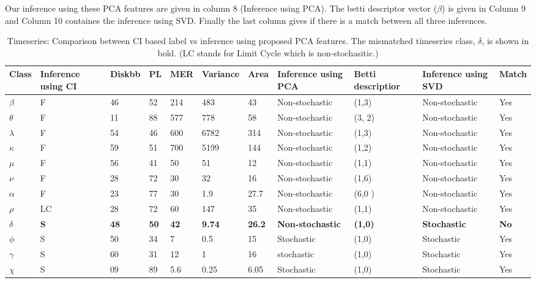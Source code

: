 \documentclass[10pt,conference]{IEEEtran}
\begin{document}
Our inference using these PCA features are given in column 8 (Inference using PCA). The betti descriptor vector ($\beta$) is given in Column 9 and Column 10 containes the inference using SVD. Finally the last column gives if there is a match between all three inferences.

\begin{table}[t]
\caption{Timeseries: Comparison between CI based label vs inference using proposed PCA features. The mismatched timeseries class, $\delta$, is shown in bold. (LC stands for Limit Cycle \cite{Adegoke2018} which is non-stochasitic.)}
\begin{center}
  \begin{tabular}{|p{0.5cm}|p{1cm}|p{0.75cm}|p{0.5cm}|p{0.75cm}|p{1cm}|p{0.5cm}|p{1.8cm}|p{2.5cm}|p{3cm}|p{0.75cm}|}
\hline
Class & Inference using \newline CI & Diskbb & PL & MER & Variance & Area & Inference using \newline PCA & Betti descriptior & Inference using \newline SVD & Match \\
\hline
$\beta$ & F & 46 & 52 & 214 & 483 & 43 & Non-stochastic & (1,3)& Non-stochastic &Yes\\
\hline
$\theta$ & F & 11 &  88 & 577 & 778 & 58&Non-stochastic & (3, 2) & Non-stochastic & Yes \\
\hline
$\lambda$ & F & 54 & 46 & 600 & 6782 & 314 & Non-stochastic & (1,3) &Non-stochastic&Yes \\
\hline
$\kappa$ & F & 59 & 51 & 700 & 5199 & 144 & Non-stochastic & (1,2) &Non-stochastic&Yes \\
\hline
$\mu$ & F & 56 & 41 & 50 & 51 & 12 & Non-stochastic & (1,1) &Non-stochastic&Yes \\
\hline
$\nu$ & F & 28 & 72 & 30 & 32 & 16 & Non-stochastic & (1,6) &Non-stochastic&Yes\\
\hline
$\alpha$ & F & 23 & 77 & 30 & 1.9 & 27.7 & Non-stochastic & (6,0 ) &Non-stochastic&Yes \\
\hline
$\rho$ & LC & 28 & 72 & 60 & 147 & 35 & Non-stochastic & (1,1) &Non-stochastic&Yes \\
\hline
\textbf{$\delta$} & \textbf{S} & \textbf{48} & \textbf{50} & \textbf{42} & \textbf{9.74} & \textbf{26.2} & \textbf{Non-stochastic} &\textbf{(1,0)}& \textbf{Stochastic}& \textbf{No} \\
\hline
$\phi$ & S & 50 & 34 & 7 & 0.5 & 15 & Stochastic &(1,0)&Stochastic& Yes \\
\hline
$\gamma$ & S & 60 & 31 & 12 & 1 & 16 & stochastic &(1,0)&Stochastic& Yes \\
\hline
$\chi$ & S & 09 & 89 & 5.6 & 0.25 & 6.05 & Stochastic &(1,0)&Stochastic& Yes \\
\hline
\end{tabular}
\label{tab:results}
\end{center}
\end{table}
\end{document}
